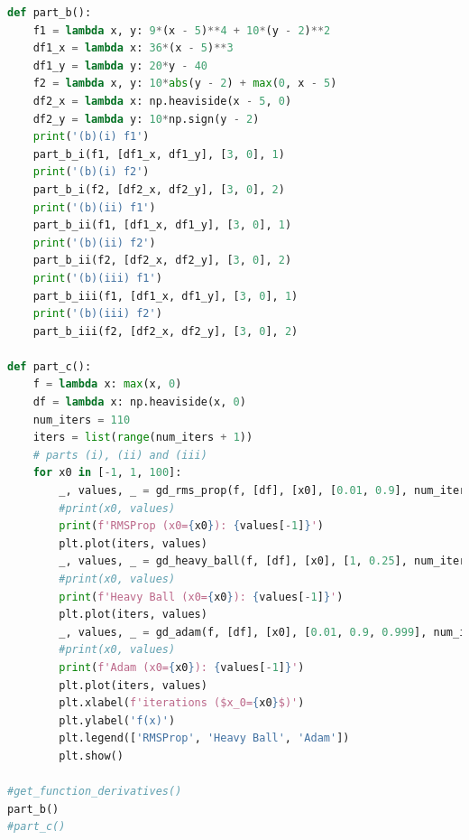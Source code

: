 \documentclass[12pt]{article}
\begin{document}
\begin{lstlisting}[language=Python]
def part_b():
    f1 = lambda x, y: 9*(x - 5)**4 + 10*(y - 2)**2
    df1_x = lambda x: 36*(x - 5)**3
    df1_y = lambda y: 20*y - 40
    f2 = lambda x, y: 10*abs(y - 2) + max(0, x - 5)
    df2_x = lambda x: np.heaviside(x - 5, 0)
    df2_y = lambda y: 10*np.sign(y - 2)
    print('(b)(i) f1')
    part_b_i(f1, [df1_x, df1_y], [3, 0], 1)
    print('(b)(i) f2')
    part_b_i(f2, [df2_x, df2_y], [3, 0], 2)
    print('(b)(ii) f1')
    part_b_ii(f1, [df1_x, df1_y], [3, 0], 1)
    print('(b)(ii) f2')
    part_b_ii(f2, [df2_x, df2_y], [3, 0], 2)
    print('(b)(iii) f1')
    part_b_iii(f1, [df1_x, df1_y], [3, 0], 1)
    print('(b)(iii) f2')
    part_b_iii(f2, [df2_x, df2_y], [3, 0], 2)

def part_c():
    f = lambda x: max(x, 0)
    df = lambda x: np.heaviside(x, 0)
    num_iters = 110
    iters = list(range(num_iters + 1))
    # parts (i), (ii) and (iii)
    for x0 in [-1, 1, 100]:
        _, values, _ = gd_rms_prop(f, [df], [x0], [0.01, 0.9], num_iters=num_iters)
        #print(x0, values)
        print(f'RMSProp (x0={x0}): {values[-1]}')
        plt.plot(iters, values)
        _, values, _ = gd_heavy_ball(f, [df], [x0], [1, 0.25], num_iters=num_iters)
        #print(x0, values)
        print(f'Heavy Ball (x0={x0}): {values[-1]}')
        plt.plot(iters, values)
        _, values, _ = gd_adam(f, [df], [x0], [0.01, 0.9, 0.999], num_iters=num_iters)
        #print(x0, values)
        print(f'Adam (x0={x0}): {values[-1]}')
        plt.plot(iters, values)
        plt.xlabel(f'iterations ($x_0={x0}$)')
        plt.ylabel('f(x)')
        plt.legend(['RMSProp', 'Heavy Ball', 'Adam'])
        plt.show()

#get_function_derivatives()
part_b()
#part_c()
\end{lstlisting}
\end{document}
